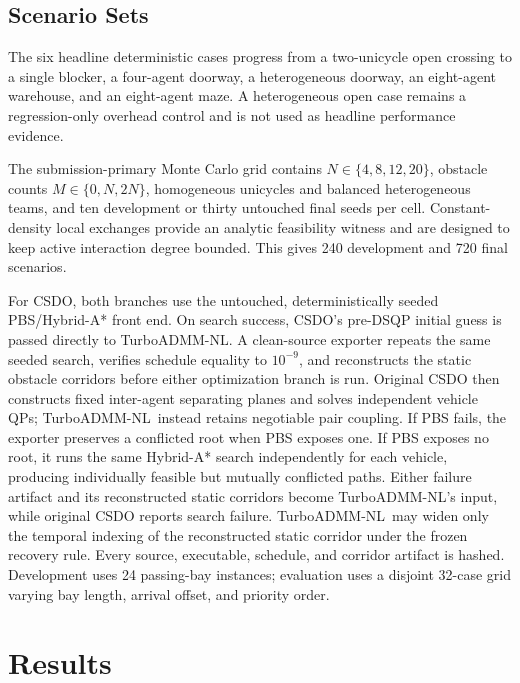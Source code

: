 \documentclass[letterpaper,10pt,conference]{ieeeconf}
\newcommand{\method}{TurboADMM-NL}
\begin{document}
\subsection{Scenario Sets}
The six headline deterministic cases progress from a two-unicycle open
crossing to a single blocker, a four-agent doorway, a heterogeneous doorway,
an eight-agent warehouse, and an eight-agent maze. A heterogeneous open case
remains a regression-only overhead control and is not used as headline
performance evidence.

The submission-primary Monte Carlo grid contains
$N\in\{4,8,12,20\}$, obstacle counts $M\in\{0,N,2N\}$, homogeneous
unicycles and balanced heterogeneous teams, and ten development or thirty
untouched final seeds per cell. Constant-density local exchanges provide an
analytic feasibility witness and are designed to keep active interaction
degree bounded. This gives 240 development and 720 final scenarios.

For CSDO, both branches use the untouched, deterministically seeded
PBS/Hybrid-A* front end. On search success, CSDO's pre-DSQP initial guess is
passed directly to \method. A clean-source exporter repeats the same seeded
search, verifies schedule equality to $10^{-9}$, and reconstructs the static
obstacle corridors before either optimization branch is run.
Original CSDO then constructs fixed inter-agent separating planes and solves
independent vehicle QPs; \method\ instead retains negotiable pair coupling. If
PBS fails, the exporter preserves a conflicted root when PBS exposes one. If
PBS exposes no root, it runs the same Hybrid-A* search independently for each
vehicle, producing individually feasible but mutually conflicted paths.
Either failure artifact and its reconstructed static corridors become
\method's input, while original CSDO reports search failure. \method\ may
widen only the temporal indexing of the reconstructed static corridor under
the frozen recovery rule. Every source, executable, schedule, and corridor
artifact is hashed. Development uses 24 passing-bay
instances; evaluation uses a disjoint 32-case grid varying bay length, arrival
offset, and priority order.

\section{Results}
\label{sec:results}

\ifdefined\DeterministicTableRows
\end{document}
